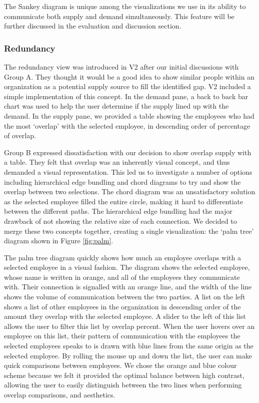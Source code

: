 \documentclass[journal]{vgtc}                %
\begin{document}
The Sankey diagram is unique among the visualizations we use in its ability to communicate both supply and demand simultaneously. This feature will be further discussed in the evaluation and discussion section.

\subsubsection{Redundancy}

The redundancy view was introduced in V2 after our initial discussions with Group A.  They thought it would be a good idea to show similar people within an organization as a potential supply source to fill the identified gap. V2 included a simple implementation of this concept. In the demand pane, a back to back bar chart was used to help the user determine if the supply lined up with the demand. In the supply pane, we provided a table showing the employees who had the most \lq overlap\rq{} with the selected employee, in descending order of percentage of overlap.

Group B expressed dissatisfaction with our decision to show overlap supply with a table. They felt that overlap was an inherently visual concept, and thus demanded a visual representation. This led us to investigate a number of options including hierarchical edge bundling and chord diagrams to try and show the overlap between two selections.  The chord diagram was an unsatisfactory solution as the selected employee filled the entire circle, making it hard to differentiate between the different paths.  The hierarchical edge bundling had the major drawback of not showing the relative size of each connection.  We decided to merge these two concepts together, creating a single visualization: the \lq palm tree\rq{} diagram shown in Figure \ref{fig:palm}.

The palm tree diagram quickly shows how much an employee overlaps with a selected employee in a visual fashion. The diagram shows the selected employee, whose name is written in orange, and all of the employees they communicate with. Their connection is signalled with an orange line, and the width of the line shows the volume of communication between the two parties. A list on the left shows a list of other employees in the organization in descending order of the amount they overlap with the selected employee. A slider to the left of this list allows the user to filter this list by overlap percent. When the user hovers over an employee on this list, their pattern of communication with the employees the selected employees speaks to is drawn with blue lines from the same origin as the selected employee. By rolling the mouse up and down the list, the user can make quick comparisons between employees. We chose the orange and blue colour scheme because we felt it provided the optimal balance between high contrast, allowing the user to easily distinguish between the two lines when performing overlap comparisons, and aesthetics. 
\end{document}
